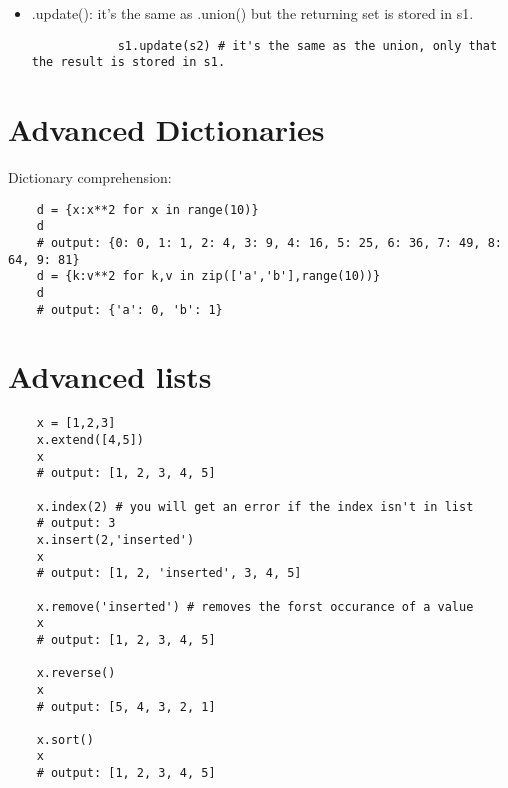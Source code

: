 \begin{itemize}
    \item {}.update(): it's the same as .union() but the returning set is stored in s1.
        \begin{verbatim}
            s1.update(s2) # it's the same as the union, only that the result is stored in s1. 
        \end{verbatim}
\end{itemize}   


\section{Advanced Dictionaries}
Dictionary comprehension: 
\begin{verbatim}
    d = {x:x**2 for x in range(10)}
    d
    # output: {0: 0, 1: 1, 2: 4, 3: 9, 4: 16, 5: 25, 6: 36, 7: 49, 8: 64, 9: 81}
    d = {k:v**2 for k,v in zip(['a','b'],range(10))}
    d 
    # output: {'a': 0, 'b': 1}
\end{verbatim}

\section{Advanced lists}
\begin{verbatim}
    x = [1,2,3]
    x.extend([4,5])
    x 
    # output: [1, 2, 3, 4, 5]

    x.index(2) # you will get an error if the index isn't in list
    # output: 3
    x.insert(2,'inserted')
    x 
    # output: [1, 2, 'inserted', 3, 4, 5]

    x.remove('inserted') # removes the forst occurance of a value
    x
    # output: [1, 2, 3, 4, 5]

    x.reverse() 
    x 
    # output: [5, 4, 3, 2, 1]

    x.sort()
    x
    # output: [1, 2, 3, 4, 5]
\end{verbatim}
